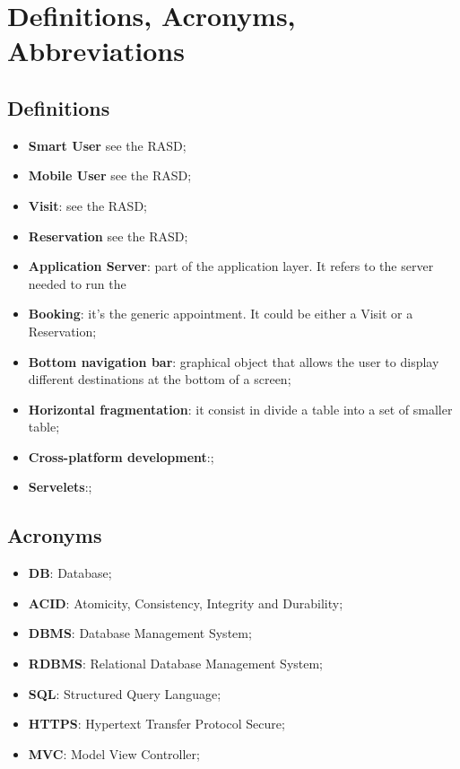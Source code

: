 \section{Definitions, Acronyms, Abbreviations}
\subsection{Definitions}
\begin{itemize}
\item \textbf{Smart User} see the RASD;
\item \textbf{Mobile User} see the RASD;
\item \textbf{Visit}: see the RASD; 
\item \textbf{Reservation} see the RASD;
\item \textbf{Application Server}: part of the application layer. It refers to the server needed to run the 
\item \textbf{Booking}: it's the generic appointment. It could be either a Visit or a Reservation;
\item \textbf{Bottom navigation bar}: graphical object that allows the user to display different destinations at the bottom of a screen;
\item \textbf{Horizontal fragmentation}: it consist in divide a table into a set of smaller table;
\item \textbf{Cross-platform development}:;
\item \textbf{Servelets}:;

\end{itemize}
\subsection{Acronyms}
\begin{itemize}

\item \textbf{DB}: Database;
\item \textbf{ACID}: Atomicity, Consistency, Integrity and Durability;
\item \textbf{DBMS}: Database Management System;
\item \textbf{RDBMS}: Relational Database Management System;
\item \textbf{SQL}: Structured Query Language;
\item \textbf{HTTPS}: Hypertext Transfer Protocol Secure;
\item \textbf{MVC}: Model View Controller;


\end{itemize}
